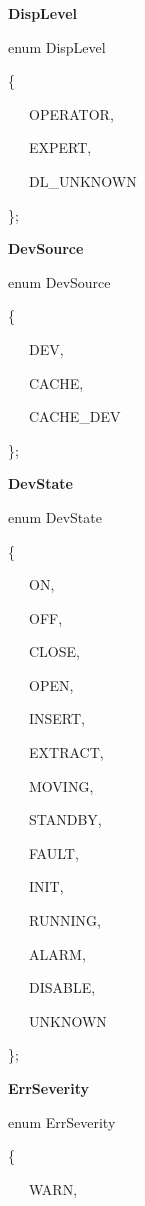 \begin{flushleft}
\textbf{DispLevel}
\par\end{flushleft}

enum DispLevel

\{

~~~OPERATOR,

~~~EXPERT,

~~~DL\_UNKNOWN

\};\\

\begin{flushleft}
\textbf{DevSource}
\par\end{flushleft}

enum DevSource

\{

~~~DEV,

~~~CACHE,

~~~CACHE\_DEV

\};\\

\begin{flushleft}
\textbf{DevState}
\par\end{flushleft}

enum DevState

\{

~~~ON,

~~~OFF,

~~~CLOSE,

~~~OPEN,

~~~INSERT,

~~~EXTRACT,

~~~MOVING,

~~~STANDBY,

~~~FAULT,

~~~INIT,

~~~RUNNING,

~~~ALARM,

~~~DISABLE,

~~~UNKNOWN

\};\\

\begin{flushleft}
\textbf{ErrSeverity}
\par\end{flushleft}

enum ErrSeverity

\{

~~~WARN,

